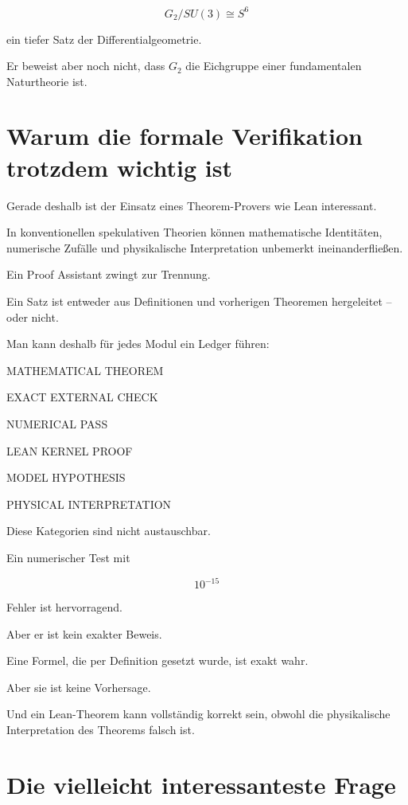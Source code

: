 \documentclass[11pt,a4paper]{article}
\begin{document}
\[
G_2/SU(3)\cong S^6
\]


ein tiefer Satz der Differentialgeometrie.


Er beweist aber noch nicht, dass \(G_2\) die Eichgruppe einer fundamentalen Naturtheorie ist.





\section{Warum die formale Verifikation trotzdem wichtig ist}


Gerade deshalb ist der Einsatz eines Theorem-Provers wie Lean interessant.


In konventionellen spekulativen Theorien können mathematische Identitäten, numerische Zufälle und physikalische Interpretation unbemerkt ineinanderfließen.


Ein Proof Assistant zwingt zur Trennung.


Ein Satz ist entweder aus Definitionen und vorherigen Theoremen hergeleitet – oder nicht.


Man kann deshalb für jedes Modul ein Ledger führen:


MATHEMATICAL THEOREM

EXACT EXTERNAL CHECK

NUMERICAL PASS

LEAN KERNEL PROOF

MODEL HYPOTHESIS

PHYSICAL INTERPRETATION


Diese Kategorien sind nicht austauschbar.


Ein numerischer Test mit


\[
10^{-15}
\]


Fehler ist hervorragend.


Aber er ist kein exakter Beweis.


Eine Formel, die per Definition gesetzt wurde, ist exakt wahr.


Aber sie ist keine Vorhersage.


Und ein Lean-Theorem kann vollständig korrekt sein, obwohl die physikalische Interpretation des Theorems falsch ist.





\section{Die vielleicht interessanteste Frage}
\end{document}
